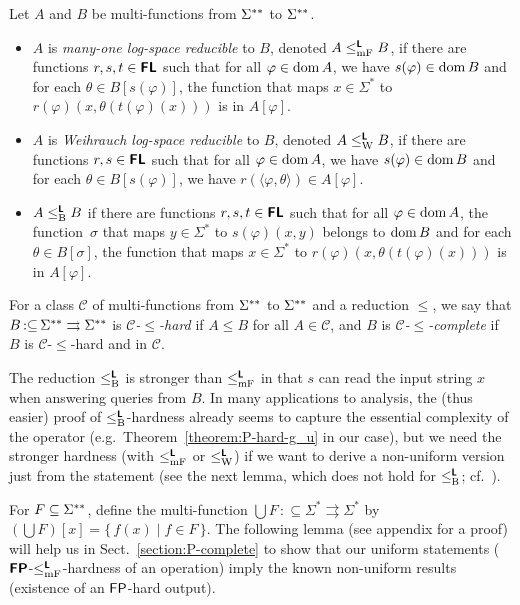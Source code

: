 \documentclass[a4paper,UKenglish]{lipics}
\newcommand{\pcolon}{\mathpunct{\,:\subseteq}}
\begin{document}
\begin{definition}
Let $A$ and $B$ be multi-functions from $\Sigma ^{**}$ to $\Sigma ^{**}$.
\begin{itemize}
 \item $A$ is \emph{many-one log-space reducible} to $B$, 
       denoted $A \leq _{\mathrm{mF}} ^{\text{\bfseries \sffamily \upshape L}} B$,
       if there are functions $r, s, t \in \text{\bfseries \sffamily \upshape FL}$ such that 
       for all $\varphi \in \mathop{\rm dom} A$,
       we have $s(\varphi) \in \mathop{\rm dom} B$ and 
       for each $\theta \in B[s(\varphi)]$, 
       the function that maps $x \in \Sigma^*$ to $r(\varphi)(x, \theta(t(\varphi)(x)))$
       is in $A[\varphi]$.
 \item $A$ is \emph{Weihrauch log-space reducible} to $B$,
       denoted $A \leq _{\mathrm W} ^{\text{\bfseries \sffamily \upshape L}} B$,
       if there are functions $r, s \in \text{\bfseries \sffamily \upshape FL}$ such that 
       for all $\varphi \in \mathop{\rm dom} A$,
       we have $s(\varphi) \in \mathop{\rm dom} B$ and 
       for each $\theta \in B[s(\varphi)]$, 
       we have $r(\langle \varphi, \theta \rangle) \in A[\varphi]$.
 \item $A \leq _{\mathrm B} ^{\text{\bfseries \sffamily \upshape L}} B$ 
if there are functions $r, s, t \in \text{\bfseries \sffamily \upshape FL}$ such that 
for all $\varphi \in \mathop{\rm dom} A$,
the function~$\sigma$ that maps $y \in \Sigma ^*$ to $s (\varphi) (x, y)$
belongs to $\mathop{\rm dom} B$ 
and for each $\theta \in B [\sigma]$, 
the function that maps $x \in \Sigma^*$ 
to $r(\varphi)(x, \theta(t(\varphi)(x)))$ is in $A[\varphi]$.
\end{itemize}
\end{definition}

For a class $\mathcal{C}$ of multi-functions from $\Sigma ^{**}$ to $\Sigma ^{**}$
and a reduction $\leq$, 
we say that $B \pcolon \LM \rightrightarrows \LM$ is 
\emph{$\mathcal{C}$-$\leq$-hard} if $A \leq B$ for all $A \in \mathcal{C}$,
and $B$ is \emph{$\mathcal{C}$-$\leq$-complete} 
if $B$ is $\mathcal{C}$-$\leq$-hard and in $\mathcal{C}$.

The reduction $\leq _{\mathrm B} ^{\text{\bfseries \sffamily \upshape L}}$ is stronger than $\leq _{\mathrm{mF}} ^{\text{\bfseries \sffamily \upshape L}}$ in that 
$s$ can read the input string $x$ when answering queries from $B$.
In many applications to analysis, 
the (thus easier) proof of $\leq _{\mathrm B} ^{\text{\bfseries \sffamily \upshape L}}$-hardness 
already seems to capture the essential complexity of the operator
(e.g.~Theorem~\ref{theorem:P-hard-g_u} in our case), 
but we need the stronger hardness (with $\leq _{\mathrm{mF}} ^{\text{\bfseries \sffamily \upshape L}}$ or $\leq _{\mathrm W} ^{\text{\bfseries \sffamily \upshape L}}$)
if we want to derive a non-uniform version just from the statement
(see the next lemma, which does not hold for
$\leq _{\mathrm B} ^{\text{\bfseries \sffamily \upshape L}}$; cf.~\cite[Lemma~3.6]{kawamura2012complexity}). 

For $F \subseteq \Sigma ^{**}$, 
define the multi-function $\bigcup F \pcolon \Sigma ^* \rightrightarrows \Sigma ^*$ by
$(\bigcup F) [x] = \{\, f(x) \mid f \in F \,\}$.
The following lemma (see appendix for a proof)
will help us in Sect.~\ref{section:P-complete} to show that 
our uniform statements ($\text{\bfseries \sffamily \upshape FP}$-$\leq _{\mathrm{mF}} ^{\text{\bfseries \sffamily \upshape L}}$-hardness of an operation)
imply the known non-uniform results 
(existence of an $\mathsf{FP}$-hard output). 
\end{document}
